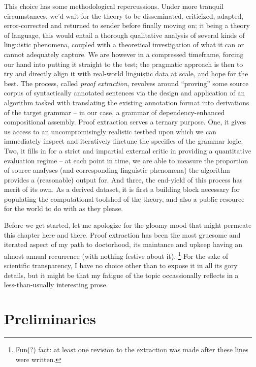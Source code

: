 This choice has some methodological repercussions.
Under more tranquil circumstances, we'd wait for the theory to be disseminated, criticized, adapted, error-corrected and returned to sender before finally moving on; it being a theory of language, this would entail a thorough qualitative analysis of several kinds of linguistic phenomena, coupled with a theoretical investigation of what it can or cannot adequately capture.
We are however in a compressed timeframe, forcing our hand into putting it straight to the test; the pragmatic approach is then to try and directly align it with real-world linguistic data at scale, and hope for the best.
The process, called \textit{proof extraction}, revolves around ``proving''  some source corpus of syntactically annotated sentences via the design and application of an algorithm tasked with translating the existing annotation format into derivations of the target grammar -- in our case, a grammar of dependency-enhanced compositional assembly.
Proof extraction serves a ternary purpose.
One, it gives us access to an uncompromisingly realistic testbed upon which we can immediately inspect and iteratively finetune the specifics of the grammar logic.
Two, it fills in for a strict and impartial external critic in providing a quantitative evaluation regime -- at each point in time, we are able to measure the proportion of source analyses (and corresponding linguistic phenomena) the algorithm provides a (reasonable) output for.
And three, the end-yield of this process has merit of its own.
As a derived dataset, it is first a building block necessary for populating the computational toolshed of the theory, and also a public resource for the world to do with as they please.

Before we get started, let me apologize for the gloomy mood that might permeate this chapter here and there.
Proof extraction has been the most gruesome and iterated aspect of my path to doctorhood, its maintance and upkeep having an almost annual recurrence (with nothing festive about it).%
\footnote{Fun(?) fact: at least one revision to the extraction was made after these lines were written.}
For the sake of scientific transparency, I have no choice other than to expose it in all its gory details, but it might be that my fatigue of the topic occassionally reflects in a less-than-usually interesting prose.

\section{Preliminaries}
\label{section:preliminaries}

